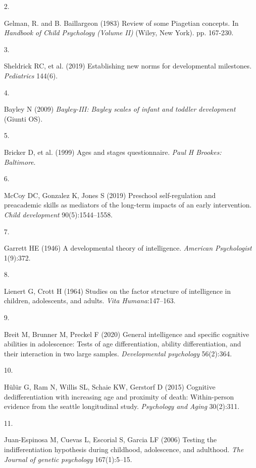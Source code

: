 \documentclass[man]{apa7}
\newlength{\csllabelwidth}
\newcommand{\CSLLeftMargin}[1]{\parbox[t]{\csllabelwidth}{#1}}
\begin{document}
\leavevmode\hypertarget{ref-gelman1983preschoolers}{}%
\CSLLeftMargin{2.}Gelman, R. and B. Baillargeon (1983) Review of some Piagetian concepts. In \emph{Handbook of Child Psychology (Volume II)} (Wiley, New York). pp. 167-230.

\leavevmode\hypertarget{ref-sheldrick2019establishing}{}%
\CSLLeftMargin{3.}Sheldrick RC, et al. (2019) Establishing new norms for
developmental milestones. \emph{Pediatrics} 144(6).

\leavevmode\hypertarget{ref-bayley2009bayley}{}%
\CSLLeftMargin{4. }Bayley N (2009) \emph{Bayley-III: Bayley scales of
infant and toddler development} (Giunti OS).

\leavevmode\hypertarget{ref-bricker1999ages}{}%
\CSLLeftMargin{5. }Bricker D, et al. (1999) Ages and stages questionnaire.
\emph{Paul H Brookes: Baltimore}.

\leavevmode\hypertarget{ref-mccoy2019preschool}{}%
\CSLLeftMargin{6. }McCoy DC, Gonzalez K, Jones S (2019) Preschool
self-regulation and preacademic skills as mediators of the long-term
impacts of an early intervention. \emph{Child development}
90(5):1544--1558.

\leavevmode\hypertarget{ref-garrett1946developmental}{}%
\CSLLeftMargin{7. }Garrett HE (1946) A developmental theory of
intelligence. \emph{American Psychologist} 1(9):372.

\leavevmode\hypertarget{ref-lienert1964studies}{}%
\CSLLeftMargin{8. }Lienert G, Crott H (1964) Studies on the factor
structure of intelligence in children, adolescents, and adults.
\emph{Vita Humana}:147--163.

\leavevmode\hypertarget{ref-breit2020general}{}%
\CSLLeftMargin{9. }Breit M, Brunner M, Preckel F (2020) General
intelligence and specific cognitive abilities in adolescence: Tests of
age differentiation, ability differentiation, and their interaction in
two large samples. \emph{Developmental psychology} 56(2):364.

\leavevmode\hypertarget{ref-hulur2015cognitive}{}%
\CSLLeftMargin{10. }Hülür G, Ram N, Willis SL, Schaie KW, Gerstorf D (2015)
Cognitive dedifferentiation with increasing age and proximity of death:
Within-person evidence from the seattle longitudinal study.
\emph{Psychology and Aging} 30(2):311.

\leavevmode\hypertarget{ref-juan2006testing}{}%
\CSLLeftMargin{11. }Juan-Espinosa M, Cuevas L, Escorial S, Garcia LF (2006)
Testing the indifferentiation hypothesis during childhood, adolescence,
and adulthood. \emph{The Journal of genetic psychology} 167(1):5--15.
\end{document}
